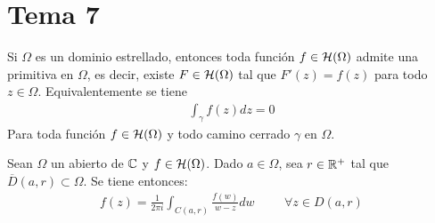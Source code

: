 \documentclass[12pt]{article}
\begin{document}
    \newpage

    \section{Tema 7}

    \begin{teo}
        Si $\Omega$ es un dominio estrellado, entonces toda función $f\in \mathcal{H}(\Omega)$ admite una primitiva en $\Omega$, es decir, existe $F\in \mathcal{H}(\Omega)$ tal que $F'(z) = f(z)$ para todo $z\in \Omega$. Equivalentemente se tiene
        \begin{gather*}
            \int_\gamma f(z) dz = 0
        \end{gather*}
        Para toda función $f\in \mathcal{H}(\Omega)$ y todo camino cerrado $\gamma$ en $\Omega$.
    \end{teo}

    \begin{prop}
        Sean $\Omega$ un abierto de $\mathbb{C}$ y $f\in \mathcal{H}(\Omega)$. Dado $a\in \Omega$, sea $r\in \mathbb{R}^+$ tal que $\overline{D}(a,r)\subset \Omega$. Se tiene entonces:
        \begin{gather*}
            f(z) = \frac{1}{2\pi i } \int_{C(a,r)} \frac{f(w)}{w-z} dw \hspace{1cm} \forall z \in D(a,r)
        \end{gather*}
    \end{prop}

    \newpage
\end{document}
